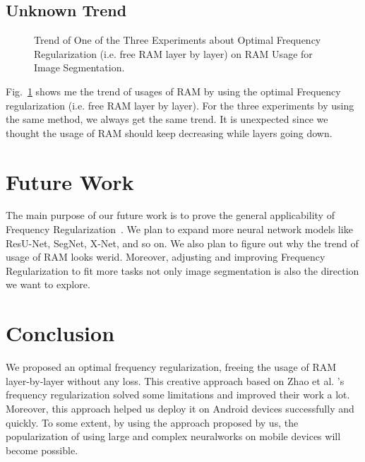 \documentclass[runningheads]{llncs}
\begin{document}
\subsection{Unknown Trend}
\begin{figure}[h]
	\centering
	\caption{Trend of One of the Three Experiments about Optimal Frequency Regularization (i.e. free RAM layer by layer) on RAM Usage for Image Segmentation.}
	\label{plot:optimal}
\end{figure}
Fig.~\ref{plot:optimal} shows me the trend of usages of RAM by using the optimal Frequency regularization (i.e. free RAM layer by layer). For the three experiments by using the same method, we always get the same trend. It is unexpected since we thought the usage of RAM should keep decreasing while layers going down. 




\section{Future Work}
The main purpose of our future work is to prove the general applicability of Frequency Regularization~\cite{zhao2023fr}. We plan to expand more neural network models like ResU-Net, SegNet, X-Net, and so on. We also plan to figure out why the trend of usage of RAM looks werid. Moreover, adjusting and improving Frequency Regularization to fit more tasks not only image segmentation is also the direction we want to explore.


\section{Conclusion} 
We proposed an optimal frequency regularization, freeing the usage of RAM layer-by-layer without any loss. This creative approach based on Zhao et al. 's frequency regularization solved some limitations and improved their work a lot. Moreover, this approach helped us deploy it on Android devices successfully and quickly. To some extent, by using the approach proposed by us, the popularization of using large and complex neuralworks on mobile devices will become possible.

\newpage


\end{document}
